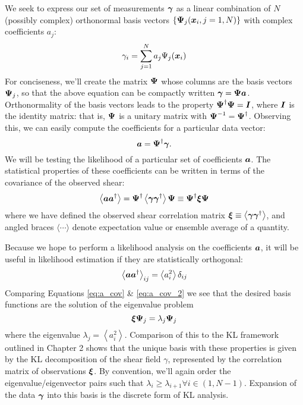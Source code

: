 We seek to express our set of measurements $\boldsymbol{\gamma}$
as a linear combination of $N$ (possibly complex) 
orthonormal basis vectors
$\{\boldsymbol{\Psi}_j(\boldsymbol{x}_i, j=1,N)\}$ with complex coefficients
$a_j$:
\begin{equation}
  \label{eq:gamma_decomp}
  \gamma_i = \sum_{j=1}^{N} a_j \Psi_j(\boldsymbol{x}_i)
\end{equation}
For conciseness, we'll create the matrix $\boldsymbol{\Psi}$ whose columns are
the basis vectors $\boldsymbol{\Psi}_j$, so that the above equation can be
compactly written $\boldsymbol{\gamma} = \boldsymbol{\Psi}\boldsymbol{a}$.  Orthonormality
of the basis vectors leads to the property
$\boldsymbol{\Psi}^\dagger\boldsymbol{\Psi} = \boldsymbol{I}$, where $\boldsymbol{I}$ is the identity
matrix: that is, $\boldsymbol{\Psi}$ is a unitary matrix with
$\boldsymbol{\Psi}^{-1} = \boldsymbol{\Psi}^\dagger$.  Observing this, we can easily compute
the coefficients for a particular data vector:
\begin{equation}
  \boldsymbol{a} = \boldsymbol{\Psi}^\dagger \boldsymbol{\gamma}.
\end{equation}
We will be testing the likelihood of a particular set of coefficients
$\boldsymbol{a}$.  
The statistical properties of these coefficients can be written in terms of
the covariance of the observed shear:
\begin{equation}
  \label{eq:a_cov}
  \left\langle \boldsymbol{a}\boldsymbol{a}^\dagger \right\rangle 
  =  \boldsymbol{\Psi}^\dagger
  \left\langle \boldsymbol{\gamma}\boldsymbol{\gamma}^\dagger \right\rangle 
  \boldsymbol{\Psi}
  \equiv \boldsymbol{\Psi}^\dagger \boldsymbol{\xi}  \boldsymbol{\Psi}
\end{equation}
where we have defined the observed shear correlation matrix 
$\boldsymbol{\xi} \equiv \left\langle 
\boldsymbol{\gamma}\boldsymbol{\gamma}^\dagger \right\rangle$, and angled braces
$\langle\cdots\rangle$ denote expectation value or ensemble average
of a quantity.

Because we hope to perform a likelihood analysis on the coefficients
$\boldsymbol{a}$, it will be useful in likelihood estimation if they are
statistically orthogonal:
\begin{equation}
  \label{eq:a_cov_2}
  \left\langle \boldsymbol{a}\boldsymbol{a}^\dagger \right\rangle_{ij}
  = \left\langle a_i^2 \right\rangle \delta_{ij}
\end{equation}
Comparing Equations \ref{eq:a_cov} \& \ref{eq:a_cov_2} we see that the desired
basis functions are the solution of the eigenvalue problem
\begin{equation}
  \boldsymbol{\xi} \boldsymbol{\Psi}_j = \lambda_j \boldsymbol{\Psi}_j
\end{equation}
where the eigenvalue $\lambda_j = \left\langle a_i^2 \right\rangle$.
Comparison of this to the KL framework outlined in Chapter 2 shows that
the unique basis with these properties is given by the KL decomposition
of the shear field $\gamma$, represented by the correlation matrix
of observations $\boldsymbol{\xi}$.
By convention, we'll again order the eigenvalue/eigenvector pairs such that
$\lambda_i \ge \lambda_{i+1} \forall i\in(1, N-1)$.
Expansion of the data $\boldsymbol{\gamma}$ into this basis is the discrete form
of KL analysis.

